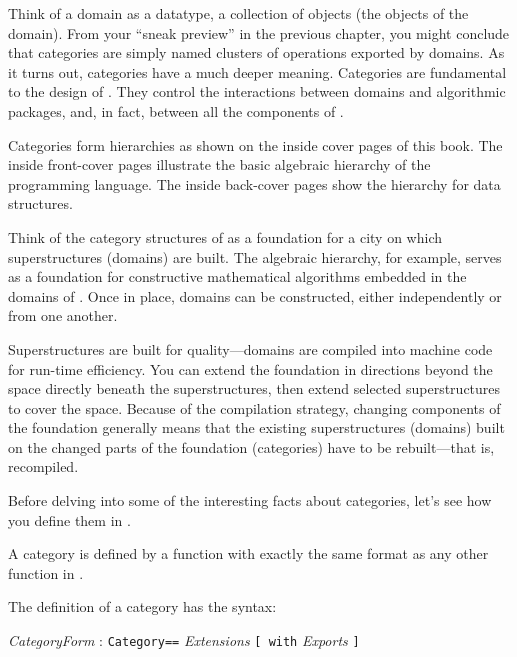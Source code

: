 Think of a domain as a datatype, a collection of objects (the
objects of the domain).
From your ``sneak preview'' in the previous chapter, you might
conclude that categories are simply named clusters of operations
exported by domains.
As it turns out, categories have a much deeper meaning.
Categories are fundamental to the design of \Language{}.
They control the interactions between domains and algorithmic
packages, and, in fact, between all the components of \Language{}.

Categories form hierarchies as shown on the inside cover pages of
this book.
The inside front-cover pages illustrate the basic
algebraic hierarchy of the \Language{} programming language.
The inside back-cover pages show the hierarchy for data
structures.

Think of the category structures of \Language{} as a foundation
for a city on which superstructures (domains) are built.
The algebraic hierarchy, for example, serves as a foundation for
constructive mathematical algorithms embedded in the domains of
\Language{}.
Once in place, domains can be constructed, either independently or
from one another.

Superstructures are built for quality---domains are compiled into
machine code for run-time efficiency.
You can extend the foundation in directions beyond the space
directly beneath the superstructures, then extend selected
superstructures to cover the space.
Because of the compilation strategy, changing components of the
foundation generally means that the existing superstructures
(domains) built on the changed parts of the foundation
(categories) have to be rebuilt---that is, recompiled.

Before delving into some of the interesting facts about categories, let's see
how you define them in \Language{}.


A category is defined by a function with exactly the same format as
any other function in \Language{}.

\beginImportant
The definition of a category has the syntax:
\begin{center}
{\it CategoryForm} : {\tt Category\quad{}==\quad{}} {\it Extensions} {\tt [ with} {\it Exports} {\tt ]}
\end{center}

